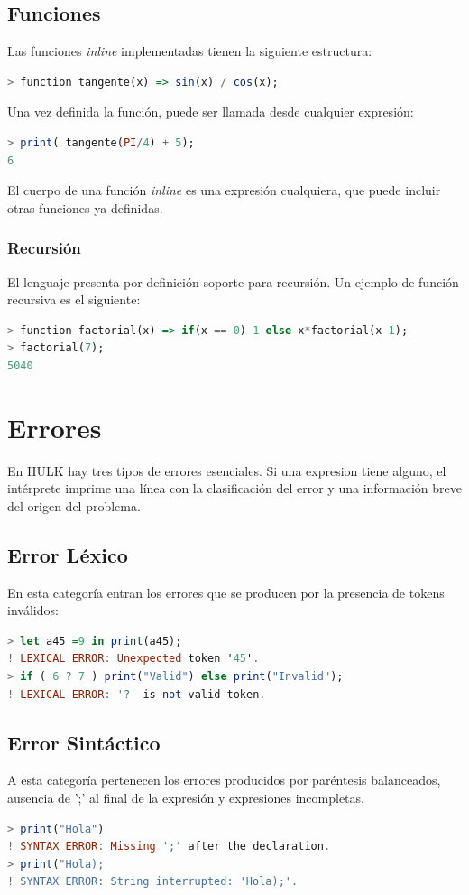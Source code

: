 \documentclass[a4paper, 12pt]{article}
\begin{document}
\subsection{Funciones}
Las funciones \textit{inline} implementadas tienen la siguiente estructura:
 \begin{lstlisting}[language= Haskell]
> function tangente(x) => sin(x) / cos(x);
\end{lstlisting}
Una vez definida la función, puede ser llamada desde cualquier expresión:
\begin{lstlisting}[language= Haskell]
> print( tangente(PI/4) + 5);
6
\end{lstlisting}
El cuerpo de una función \textit{inline} es una expresión cualquiera, que puede incluir otras funciones ya definidas.
\subsubsection{Recursión}
El lenguaje presenta por definición soporte para recursión. Un ejemplo de función recursiva es el siguiente:
\begin{lstlisting}[language= Haskell]
> function factorial(x) => if(x == 0) 1 else x*factorial(x-1);  
> factorial(7);
5040
\end{lstlisting}

\newpage


\section{Errores}
En HULK hay tres tipos de errores esenciales. Si una expresion tiene alguno, el intérprete imprime una línea con la clasificación del error y una información breve del origen del problema.
\subsection{Error Léxico}
En esta categoría entran los errores que se producen por la presencia de tokens inválidos:
\begin{lstlisting}[language= Haskell]
> let a45 =9 in print(a45);
! LEXICAL ERROR: Unexpected token '45'.
> if ( 6 ? 7 ) print("Valid") else print("Invalid");
! LEXICAL ERROR: '?' is not valid token.
\end{lstlisting}
\subsection{Error Sintáctico}
A esta categoría pertenecen los errores producidos por paréntesis balanceados, ausencia de ';' al final de la expresión y expresiones incompletas.
\begin{lstlisting}[language= Haskell]
> print("Hola")
! SYNTAX ERROR: Missing ';' after the declaration.
> print("Hola);
! SYNTAX ERROR: String interrupted: 'Hola);'.

\end{lstlisting}
\end{document}
